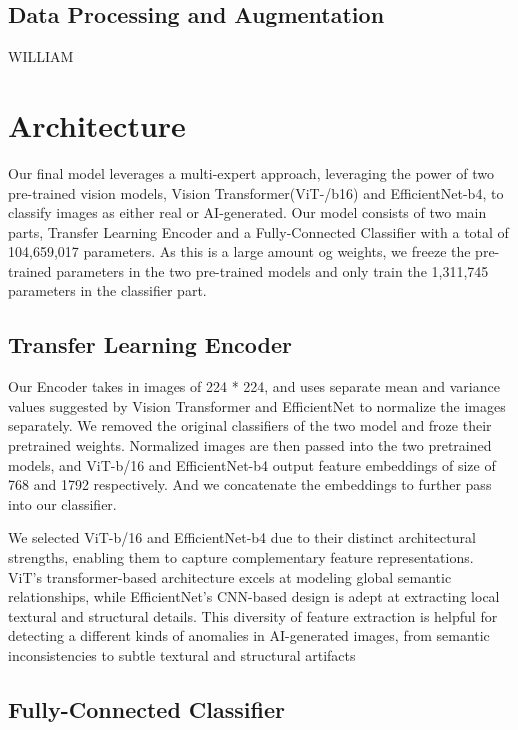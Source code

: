 \documentclass{article} %
\begin{document}
\subsection{Data Processing and Augmentation}

WILLIAM

\section{Architecture}

Our final model leverages a multi-expert approach, leveraging  the power of two pre-trained vision models, Vision Transformer(ViT-/b16) and EfficientNet-b4, to classify images as either real or AI-generated. Our model consists of two main parts, Transfer Learning Encoder and a Fully-Connected Classifier with a total of 104,659,017 parameters. As this is a large amount og weights, we  freeze the pre-trained parameters in the two pre-trained models and only train the 1,311,745 parameters in the classifier part.

\subsection{Transfer Learning Encoder}

Our Encoder takes in images of 224 * 224, and uses separate mean and variance values suggested by Vision Transformer and EfficientNet to normalize the images separately.  We removed the original classifiers of the two model and froze their pretrained weights. Normalized images are then passed into the two pretrained models, and ViT-b/16 and EfficientNet-b4 output feature embeddings of size of 768 and 1792 respectively. And we concatenate the embeddings to further pass into our classifier. 

We selected ViT-b/16 and EfficientNet-b4 due to their distinct architectural strengths, enabling them to capture complementary feature representations. ViT's transformer-based architecture excels at modeling global semantic relationships, while EfficientNet's CNN-based design is adept at extracting local textural and structural details. This diversity of feature extraction is helpful for detecting a different kinds of anomalies in AI-generated images, from semantic inconsistencies to subtle textural and structural artifacts

\subsection{Fully-Connected Classifier}
\end{document}

